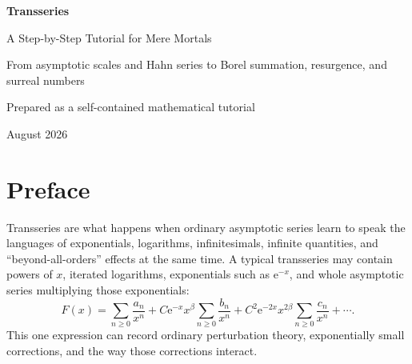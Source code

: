 \documentclass[11pt,openany]{book}
\theoremstyle{plain}
\theoremstyle{definition}
\theoremstyle{remark}
\newcommand{\e}{\mathrm{e}}
\begin{document}
\frontmatter

\begin{titlepage}
\centering
\vspace*{1.4cm}
{\Huge\bfseries\color{DeepBlue} Transseries\par}
\vspace{0.5cm}
{\LARGE A Step-by-Step Tutorial for Mere Mortals\par}
\vspace{0.8cm}
{\Large From asymptotic scales and Hahn series to Borel summation, resurgence, and surreal numbers\par}
\vfill
{}
\vfill
{\large Prepared as a self-contained mathematical tutorial\par}
\vspace{0.25cm}
{\large August 2026\par}
\end{titlepage}

\chapter*{Preface}

Transseries are what happens when ordinary asymptotic series learn to speak the languages of exponentials, logarithms, infinitesimals, infinite quantities, and ``beyond-all-orders'' effects at the same time. A typical transseries may contain powers of $x$, iterated logarithms, exponentials such as $\e^{-x}$, and whole asymptotic series multiplying those exponentials:
\[
  F(x)=\sum_{n\ge 0}\frac{a_n}{x^n}
  +C\e^{-x}x^\beta\sum_{n\ge 0}\frac{b_n}{x^n}
  +C^2\e^{-2x}x^{2\beta}\sum_{n\ge 0}\frac{c_n}{x^n}+\cdots.
\]
This one expression can record ordinary perturbation theory, exponentially small corrections, and the way those corrections interact.
\end{document}
